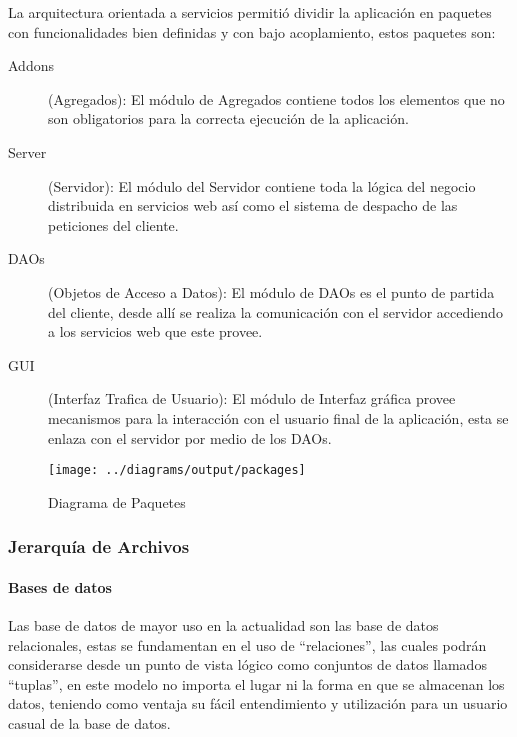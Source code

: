 La arquitectura orientada a servicios permitió dividir la aplicación en paquetes con funcionalidades bien definidas y con bajo acoplamiento, estos paquetes son:

\begin{description}
	
	\item[Addons] (Agregados):\newline
	El módulo de Agregados contiene todos los elementos que no son obligatorios para la correcta ejecución de la aplicación.
	
	\item[Server] (Servidor):\newline
	El módulo del Servidor contiene toda la lógica del negocio distribuida en servicios web así como el sistema de despacho de las peticiones del cliente.
	
	\item[DAOs] (Objetos de Acceso a Datos):\newline
	El módulo de DAOs es el punto de partida del cliente, desde allí se realiza la comunicación con el servidor accediendo a los servicios web que este provee.
	
	\item[GUI] (Interfaz Trafica de Usuario):\newline
	El módulo de Interfaz gráfica provee mecanismos para la interacción con el usuario final de la aplicación, esta se enlaza con el servidor por medio de los DAOs.
	
\end{description}

\begin{landscape}
\begin{figure}
 \centering
 \texttt{[image: ../diagrams/output/packages]}
 \caption{Diagrama de Paquetes}
 \label{diagrama:paquetes}
\end{figure}
\end{landscape}


\subsubsection{Jerarquía de Archivos}

\paragraph{Bases de datos}

Las base de datos de mayor uso en la actualidad son las base de datos relacionales, estas se fundamentan en el uso de ``relaciones'', las cuales podrán considerarse desde un punto de vista lógico como conjuntos de datos llamados ``tuplas'', en este modelo no importa el lugar ni la forma en que se almacenan los datos, teniendo como ventaja su fácil entendimiento y utilización para un usuario casual de la base de datos.

